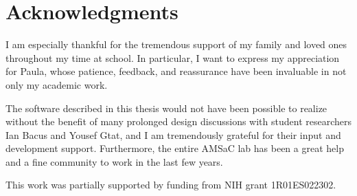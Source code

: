 \section*{Acknowledgments}

I am especially thankful for the tremendous support of my family and
loved ones throughout my time at school. In particular, I want to
express my appreciation for Paula, whose patience, feedback, and
reassurance have been invaluable in not only my academic work.

The software described in this thesis would not have been possible to
realize without the benefit of many prolonged design discussions with
student researchers Ian Bacus and Yousef Gtat, and I am tremendously
grateful for their input and development support. Furthermore, the
entire AMSaC lab has been a great help and a fine community to work in
the last few years.

This work was partially supported by funding from NIH grant
1R01ES022302.

